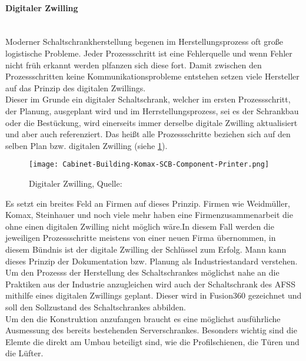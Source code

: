     \paragraph{Digitaler Zwilling}\mbox{}\\
    Moderner Schaltschrankherstellung begenen im Herstellungsprozess oft große logistische Probleme. Jeder Prozessschritt ist eine Fehlerquelle und wenn Fehler nicht früh erkannt werden plfanzen sich diese fort. Damit zwischen den Prozessschritten keine Kommunikationsprobleme entstehen setzen viele Hersteller auf das Prinzip des digitalen Zwillings.\\
    Dieser im Grunde ein digitaler Schaltschrank, welcher im ersten Prozessschritt, der Planung, ausgeplant wird und im Herrstellungsprozess, sei es der Schrankbau oder die Bestückung, wird einerseits immer derselbe digitale Zwilling aktualisiert und aber auch referenziert. Das heißt alle Prozessschritte beziehen sich auf den selben Plan bzw. digitalen Zwilling (siehe \ref{fig:digilaerZwilling}).\\

    \begin{figure}[H]
        \centering
        \texttt{[image: Cabinet-Building-Komax-SCB-Component-Printer.png]}
        \caption{Digitaler Zwilling, Quelle: \cite{digitaler_zwilling_bild}}
        \label{fig:digilaerZwilling}
    \end{figure}
    
    Es setzt ein breites Feld an Firmen auf dieses Prinzip. Firmen wie Weidmüller, Komax, Steinhauer und noch viele mehr haben eine Firmenzusammenarbeit die ohne einen digitalen Zwilling nicht möglich wäre\cite{smart_cabinet_building}.In diesem Fall werden die jeweiligen Prozessschritte meistens von einer neuen Firma übernommen, in diesem Bündnis ist der digitale Zwilling der Schlüssel zum Erfolg. Mann kann dieses Prinzip der Dokumentation bzw. Planung als Industriestandard verstehen.\\
    Um den Prozesss der Herstellung des Schaltschrankes möglichst nahe an die Praktiken aus der Industrie anzugleichen wird auch der Schaltschrank des AFSS mithilfe eines digitalen Zwillings geplant. Dieser wird in Fusion360 gezeichnet und soll den Sollzustand des Schaltschrankes abbilden.\\
    Um den die Konstruktion anzufangen braucht es eine möglichst ausführliche Ausmessung des bereits bestehenden Serverschrankes. Besonders wichtig sind die Elemte die direkt am Umbau beteiligt sind, wie die Profilschienen, die Türen und die Lüfter.\\
    
